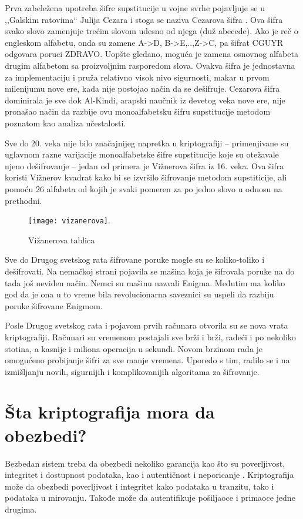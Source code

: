\documentclass[a4paper]{article}
\begin{document}
Prva zabeležena upotreba šifre supstitucije u vojne svrhe pojavljuje se u ,,Galskim ratovima“ Julija Cezara i stoga se naziva Cezarova šifra \cite{Kriptografija_wiki}. Ova šifra svako slovo zamenjuje trećim slovom udesno od njega (duž abecede). Ako je reč o engleskom alfabetu, onda su zamene A->D, B->E,..,Z->C, pa šifrat CGUYR odgovara poruci ZDRAVO. Uopšte gledano, moguća je zamena osnovnog alfabeta drugim alfabetom sa proizvoljnim rasporedom slova. Ovakva šifra je jednostavna za implementaciju i pruža relativno visok nivo sigurnosti, makar u prvom milenijumu nove ere, kada nije postojao način da se dešifruje. Cezarova šifra dominirala je sve dok Al-Kindi, arapski naučnik iz devetog veka nove ere, nije pronašao način da razbije ovu monoalfabetsku šifru supstitucije metodom poznatom kao analiza učestalosti.

Sve do 20. veka nije bilo značajnijeg napretka u kriptografiji – primenjivane su uglavnom razne varijacije monoalfabetske šifre supstitucije koje su otežavale njeno dešifrovanje – jedan od primera je Vižnerova šifra iz 16. veka. Ova šifra koristi Vižnerov kvadrat kako bi se izvršilo šifrovanje metodom supstiticije, ali pomoću 26 alfabeta od kojih je svaki pomeren za po jedno slovo u odnosu na prethodni. 

\begin{figure}[h!]
    \centering
    \texttt{[image: vizanerova]}.
    \caption{Vižanerova tablica}
    \label{fig:vizanerova}
\end{figure}

\newpage
Sve do Drugog svetskog rata šifrovane poruke mogle su se koliko-toliko i dešifrovati. Na nemačkoj strani pojavila se mašina koja je šifrovala poruke na do tada još neviđen način. Nemci su mašinu nazvali Enigma. Međutim ma koliko god da je ona u to vreme bila revolucionarna saveznici su uspeli da razbiju poruke šifrovane Enigmom.

Posle Drugog svetskog rata i pojavom prvih računara otvorila su se nova vrata kriptografiji. Računari su vremenom postajali sve brži i brži, radeći i po nekoliko stotina, a kasnije i miliona operacija u sekundi. Novom brzinom rada je omogućeno probijanje šifri za sve manje vremena. Uporedo s tim, radilo se i na izmišljanju novih, sigurnijih i komplikovanijih algoritama za šifrovanje.

\section{Šta kriptografija mora da obezbedi?}
\label{sec:šta_kriptografija_mora_da_obezbedi}
Bezbedan sistem treba da obezbedi nekoliko garancija kao što su poverljivost, integritet i dostupnost podataka, kao i autentičnost i neporicanje \cite{synopsys}. Kriptografija može da obezbedi poverljivost i integritet kako podataka u tranzitu, tako i podataka u mirovanju. Takođe može da autentifikuje pošiljaoce i primaoce jedne drugima.
\end{document}
